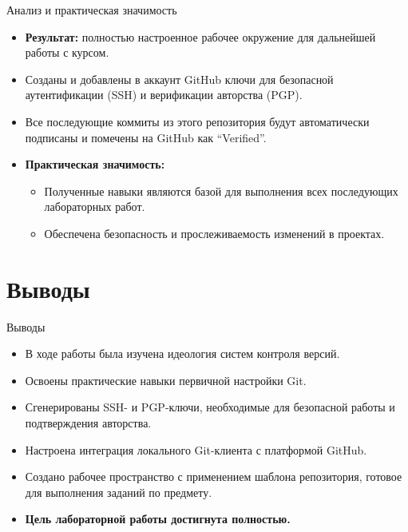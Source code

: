 \documentclass[
  ignorenonframetext,
  aspectratio=169,
  russian,
  aspectratio=169]{beamer}
\providecommand{\tightlist}{%
  \setlength{\itemsep}{0pt}\setlength{\parskip}{0pt}}
\begin{document}
\begin{frame}{Анализ и практическая значимость}
\label{ux430ux43dux430ux43bux438ux437-ux438-ux43fux440ux430ux43aux442ux438ux447ux435ux441ux43aux430ux44f-ux437ux43dux430ux447ux438ux43cux43eux441ux442ux44c}
\begin{itemize}[<+->]
\tightlist
\item
  \textbf{Результат:} полностью настроенное рабочее окружение для
  дальнейшей работы с курсом.
\item
  Созданы и добавлены в аккаунт GitHub ключи для безопасной
  аутентификации (SSH) и верификации авторства (PGP).
\item
  Все последующие коммиты из этого репозитория будут автоматически
  подписаны и помечены на GitHub как \enquote{Verified}.
\item
  \textbf{Практическая значимость:}

  \begin{itemize}[<+->]
  \tightlist
  \item
    Полученные навыки являются базой для выполнения всех последующих
    лабораторных работ.
  \item
    Обеспечена безопасность и прослеживаемость изменений в проектах.
  \end{itemize}
\end{itemize}
\end{frame}

\section{Выводы}\label{ux432ux44bux432ux43eux434ux44b}

\begin{frame}{Выводы}
\label{ux432ux44bux432ux43eux434ux44b-1}
\begin{itemize}[<+->]
\tightlist
\item
  В ходе работы была изучена идеология систем контроля версий.
\item
  Освоены практические навыки первичной настройки Git.
\item
  Сгенерированы SSH- и PGP-ключи, необходимые для безопасной работы и
  подтверждения авторства.
\item
  Настроена интеграция локального Git-клиента с платформой GitHub.
\item
  Создано рабочее пространство с применением шаблона репозитория,
  готовое для выполнения заданий по предмету.
\item
  \textbf{Цель лабораторной работы достигнута полностью.}
\end{itemize}
\end{frame}
\end{document}

